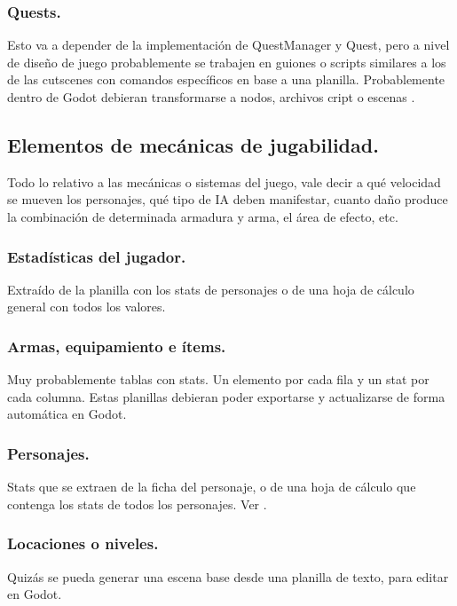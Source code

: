 \subsubsection{Quests.}\label{kit:quests}
Esto va a depender de la implementación de QuestManager y Quest, pero a nivel de diseño de juego probablemente se trabajen en guiones o scripts similares a los de las cutscenes con comandos específicos en base a una planilla. Probablemente dentro de Godot debieran transformarse a nodos, archivos cript o escenas .

\subsection{Elementos de mecánicas de jugabilidad.}\label{kit:elementos-de-mecanicas}
Todo lo relativo a las mecánicas o sistemas del juego, vale decir a qué velocidad se mueven los personajes, qué tipo de IA deben manifestar, cuanto daño produce la combinación de determinada armadura y arma, el área de efecto, etc.

\subsubsection{Estadísticas del jugador.}\label{kit:estadisticas-del-jugador}
Extraído de la planilla con los stats de personajes o de una hoja de cálculo general con todos los valores.

\subsubsection{Armas, equipamiento e ítems.}\label{kit:armas-equipamiento-items}
Muy probablemente tablas con stats. Un elemento por cada fila y un stat por cada columna. Estas planillas debieran poder exportarse y actualizarse de forma automática en Godot.

\subsubsection{Personajes.}\label{kit:personajes}
Stats que se extraen de la ficha del personaje, o de una hoja de cálculo que contenga los stats de todos los personajes. Ver .

\subsubsection{Locaciones o niveles.}\label{kit:locaciones-o-niveles}
Quizás se pueda generar una escena base desde una planilla de texto, para editar en Godot.

